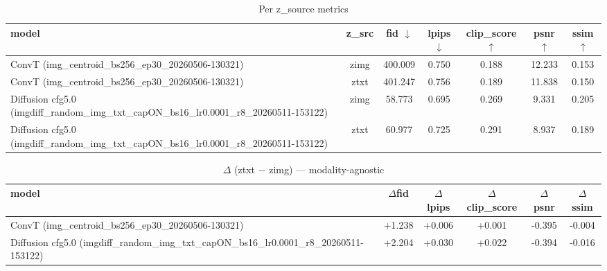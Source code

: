\begin{table}[t]
  \centering
  \caption{Per z_source metrics}
  \begin{tabular}{lcccccc}
  \toprule
  model & z\_src & fid $\downarrow$ & lpips $\downarrow$ & clip\_score $\uparrow$ & psnr $\uparrow$ & ssim $\uparrow$ \\
  \midrule
  ConvT (img\_centroid\_bs256\_ep30\_20260506-130321) & zimg & 400.009 & 0.750 & 0.188 & 12.233 & 0.153 \\
  ConvT (img\_centroid\_bs256\_ep30\_20260506-130321) & ztxt & 401.247 & 0.756 & 0.189 & 11.838 & 0.150 \\
  Diffusion cfg5.0 (imgdiff\_random\_img\_txt\_capON\_bs16\_lr0.0001\_r8\_20260511-153122) & zimg & 58.773 & 0.695 & 0.269 & 9.331 & 0.205 \\
  Diffusion cfg5.0 (imgdiff\_random\_img\_txt\_capON\_bs16\_lr0.0001\_r8\_20260511-153122) & ztxt & 60.977 & 0.725 & 0.291 & 8.937 & 0.189 \\
  \bottomrule
  \end{tabular}
\end{table}

\begin{table}[t]
  \centering
  \caption{$\Delta$ (ztxt − zimg) — modality-agnostic}
  \begin{tabular}{lccccc}
  \toprule
  model & $\Delta$fid & $\Delta$lpips & $\Delta$clip\_score & $\Delta$psnr & $\Delta$ssim \\
  \midrule
  ConvT (img\_centroid\_bs256\_ep30\_20260506-130321) & +1.238 & +0.006 & +0.001 & -0.395 & -0.004 \\
  Diffusion cfg5.0 (imgdiff\_random\_img\_txt\_capON\_bs16\_lr0.0001\_r8\_20260511-153122) & +2.204 & +0.030 & +0.022 & -0.394 & -0.016 \\
  \bottomrule
  \end{tabular}
\end{table}

